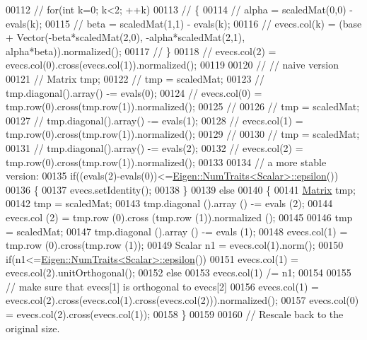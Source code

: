 \begin{DoxyCode}
00112 \textcolor{comment}{//     for(int k=0; k<2; ++k)}
00113 \textcolor{comment}{//     \{}
00114 \textcolor{comment}{//       alpha = scaledMat(0,0) - evals(k);}
00115 \textcolor{comment}{//       beta  = scaledMat(1,1) - evals(k);}
00116 \textcolor{comment}{//       evecs.col(k) = (base + Vector(-beta*scaledMat(2,0), -alpha*scaledMat(2,1),
       alpha*beta)).normalized();}
00117 \textcolor{comment}{//     \}}
00118 \textcolor{comment}{//     evecs.col(2) = evecs.col(0).cross(evecs.col(1)).normalized();}
00119 
00120 \textcolor{comment}{//   // naive version}
00121 \textcolor{comment}{//   Matrix tmp;}
00122 \textcolor{comment}{//   tmp = scaledMat;}
00123 \textcolor{comment}{//   tmp.diagonal().array() -= evals(0);}
00124 \textcolor{comment}{//   evecs.col(0) = tmp.row(0).cross(tmp.row(1)).normalized();}
00125 \textcolor{comment}{// }
00126 \textcolor{comment}{//   tmp = scaledMat;}
00127 \textcolor{comment}{//   tmp.diagonal().array() -= evals(1);}
00128 \textcolor{comment}{//   evecs.col(1) = tmp.row(0).cross(tmp.row(1)).normalized();}
00129 \textcolor{comment}{// }
00130 \textcolor{comment}{//   tmp = scaledMat;}
00131 \textcolor{comment}{//   tmp.diagonal().array() -= evals(2);}
00132 \textcolor{comment}{//   evecs.col(2) = tmp.row(0).cross(tmp.row(1)).normalized();}
00133   
00134   \textcolor{comment}{// a more stable version:}
00135   \textcolor{keywordflow}{if}((evals(2)-evals(0))<=\hyperlink{group___core___module_struct_eigen_1_1_num_traits}{Eigen::NumTraits<Scalar>::epsilon}())
00136   \{
00137     evecs.setIdentity();
00138   \}
00139   \textcolor{keywordflow}{else}
00140   \{
00141     \hyperlink{group___core___module_class_eigen_1_1_matrix}{Matrix} tmp;
00142     tmp = scaledMat;
00143     tmp.diagonal ().array () -= evals (2);
00144     evecs.col (2) = tmp.row (0).cross (tmp.row (1)).normalized ();
00145     
00146     tmp = scaledMat;
00147     tmp.diagonal ().array () -= evals (1);
00148     evecs.col(1) = tmp.row (0).cross(tmp.row (1));
00149     Scalar n1 = evecs.col(1).norm();
00150     \textcolor{keywordflow}{if}(n1<=\hyperlink{group___core___module_struct_eigen_1_1_num_traits}{Eigen::NumTraits<Scalar>::epsilon}())
00151       evecs.col(1) = evecs.col(2).unitOrthogonal();
00152     \textcolor{keywordflow}{else}
00153       evecs.col(1) /= n1;
00154     
00155     \textcolor{comment}{// make sure that evecs[1] is orthogonal to evecs[2]}
00156     evecs.col(1) = evecs.col(2).cross(evecs.col(1).cross(evecs.col(2))).normalized();
00157     evecs.col(0) = evecs.col(2).cross(evecs.col(1));
00158   \}
00159   
00160   \textcolor{comment}{// Rescale back to the original size.}

\end{DoxyCode}
